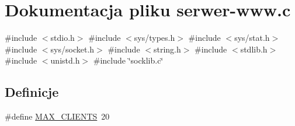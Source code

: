 \hypertarget{serwer-www_8c}{}\section{Dokumentacja pliku serwer-\/www.c}
\label{serwer-www_8c}
{\ttfamily \#include $<$stdio.\+h$>$}\newline
{\ttfamily \#include $<$sys/types.\+h$>$}\newline
{\ttfamily \#include $<$sys/stat.\+h$>$}\newline
{\ttfamily \#include $<$sys/socket.\+h$>$}\newline
{\ttfamily \#include $<$string.\+h$>$}\newline
{\ttfamily \#include $<$stdlib.\+h$>$}\newline
{\ttfamily \#include $<$unistd.\+h$>$}\newline
{\ttfamily \#include \char`\"{}socklib.\+c\char`\"{}}\newline
\subsection*{Definicje}
\begin{DoxyCompactItemize}
\item 
\#define \mbox{\hyperlink{serwer-www_8c_a0a8f91f93d75a07f0ae45077db45b3eb}{M\+A\+X\+\_\+\+C\+L\+I\+E\+N\+TS}}~20
\end{DoxyCompactItemize}
